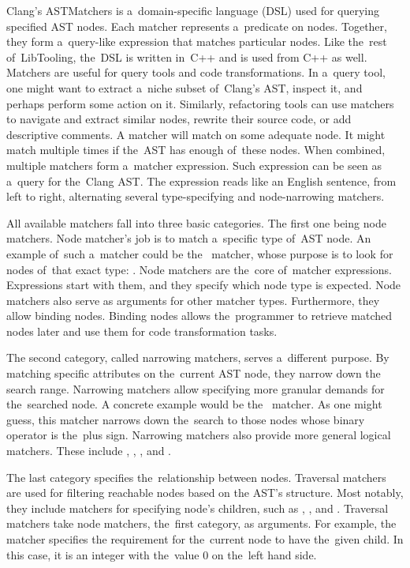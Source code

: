 Clang's ASTMatchers \citep{matchers:online} 
is a~domain-specific language (DSL) used for querying 
specified AST nodes. 
Each matcher represents a~predicate on nodes. 
Together, they form a~query-like expression that matches particular nodes. 
Like the~rest of~LibTooling, the~DSL is written in~C++ and is used from 
C++ as well.
Matchers are useful for query tools and code transformations. 
In a~query tool, one might want to extract a~niche subset of~Clang's AST, 
inspect it, and perhaps perform some action on it. 
Similarly, refactoring tools can use matchers to navigate and extract 
similar nodes, rewrite their source code, or add descriptive comments.
A matcher will match on some adequate node. 
It might match multiple times if the~AST has enough of~these nodes. 
When combined, multiple matchers form a~matcher expression. 
Such expression can be seen as a~query for the~Clang AST. 
The expression reads like an English sentence, from left to right, 
alternating several type-specifying and node-narrowing matchers.

All available matchers fall into three basic categories. 
The first one being node matchers. 
Node matcher's job is to match a~specific type of~AST node. 
An example of~such a~matcher could be the~ 
matcher, whose purpose is to look for nodes of~that exact 
type: . 
Node matchers are the~core of~matcher expressions. 
Expressions start with them, and they specify which node type is expected. 
Node matchers also serve as arguments for other matcher types. 
Furthermore, they allow binding nodes. 
Binding nodes allows the~programmer to retrieve matched nodes later and 
use them for code transformation tasks. 

The second category, called narrowing matchers, serves a~different purpose. 
By matching specific attributes on the~current AST node, they narrow down 
the search range. 
Narrowing matchers allow specifying more granular demands for the~searched 
node. 
A concrete example would be the~ matcher. 
As one might guess, this matcher narrows down the~search to those nodes 
whose binary operator is the~plus sign. 
Narrowing matchers also provide more general logical matchers. 
These include , , , 
and .

The last category specifies the~relationship between nodes. 
Traversal matchers are used for filtering reachable nodes based on 
the AST's structure. 
Most notably, they include matchers for specifying node's children, 
such as , , and . 
Traversal matchers take node matchers, the~first category, as arguments. 
For example, the~ matcher specifies
the requirement for the~current node to have the~given child. 
In this case, it is an integer with the~value 0 on the~left hand side.

